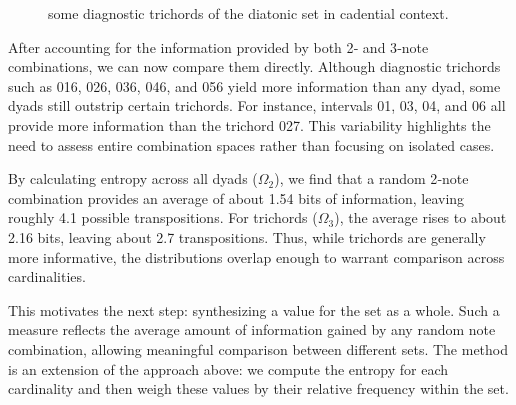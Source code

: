 \documentclass[10pt,twocolumn]{article}
\numberwithin{equation}{section} %
\begin{document}
    \begin{figure}[htbp]
        \centering
        \caption{some diagnostic trichords of the diatonic set in cadential context.}
        \label{fig:cadential}
    \end{figure}

    After accounting for the information provided by both 2‑ and 3‑note combinations, we can now compare them directly.
    Although diagnostic trichords such as 016, 026, 036, 046, and 056 yield more information than any dyad, some dyads still outstrip certain trichords.
    For instance, intervals 01, 03, 04, and 06 all provide more information than the trichord 027.
    This variability highlights the need to assess entire combination spaces rather than focusing on isolated cases.

    By calculating entropy across all dyads ($\Omega_2$), we find that a random 2‑note combination provides an average of about 1.54 bits of information, leaving roughly 4.1 possible transpositions.
    For trichords ($\Omega_3$), the average rises to about 2.16 bits, leaving about 2.7 transpositions.
    Thus, while trichords are generally more informative, the distributions overlap enough to warrant comparison across cardinalities.

    This motivates the next step: synthesizing a value for the set as a whole.
    Such a measure reflects the average amount of information gained by any random note combination, allowing meaningful comparison between different sets.
    The method is an extension of the approach above: we compute the entropy for each cardinality and then weigh these values by their relative frequency within the set.
\end{document}
